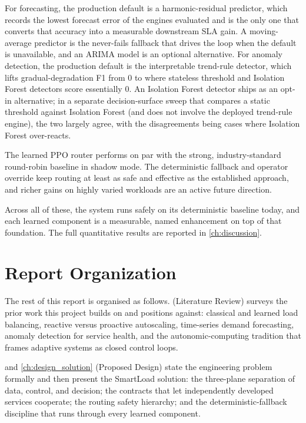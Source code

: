 For forecasting, the production default is a harmonic-residual predictor, which
records the lowest forecast error of the engines evaluated and is the only one
that converts that accuracy into a measurable downstream SLA gain. A
moving-average predictor is the never-fails fallback that drives the loop when
the default is unavailable, and an ARIMA model is an optional alternative. For
anomaly detection, the production default is the interpretable trend-rule
detector, which lifts gradual-degradation F1 from 0 to \BManFone{} where stateless
threshold and Isolation Forest detectors score essentially 0. An Isolation Forest
detector ships as an opt-in alternative; in a separate decision-surface sweep
that compares a static threshold against Isolation Forest (and does not involve
the deployed trend-rule engine), the two largely agree, with the disagreements
being cases where Isolation Forest over-reacts.

The learned PPO router performs on par with the strong, industry-standard
round-robin baseline in shadow mode. The deterministic fallback and operator
override keep routing at least as safe and effective as the established approach,
and richer gains on highly varied workloads are an active future direction.

Across all of these, the system runs safely on its deterministic baseline today,
and each learned component is a measurable, named enhancement on top of that
foundation. The full quantitative results are reported in \cref{ch:discussion}.

\section{Report Organization}
\label{sec:intro:organization}

The rest of this report is organised as follows.  (Literature
Review) surveys the prior work this project builds on and positions against:
classical and learned load balancing, reactive versus proactive autoscaling,
time-series demand forecasting, anomaly detection for service health, and the
autonomic-computing tradition that frames adaptive systems as closed control
loops.

 and \cref{ch:design_solution} (Proposed Design) state
the engineering problem formally and then present the SmartLoad solution: the
three-plane separation of data, control, and decision; the contracts that let
independently developed services cooperate; the routing safety hierarchy; and the
deterministic-fallback discipline that runs through every learned component.

